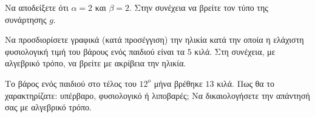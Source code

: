 \begin{alist}
\item Να αποδείξετε ότι $\alpha = 2$ και $\beta = 2$. Στην συνέχεια να βρείτε τον τύπο της συνάρτησης $g$.
\item Να προσδιορίσετε γραφικά (κατά προσέγγιση) την ηλικία κατά την οποία η ελάχιστη φυσιολογική τιμή του βάρους ενός παιδιού είναι τα $5$ κιλά. Στη συνέχεια, με αλγεβρικό τρόπο, να βρείτε με ακρίβεια την ηλικία.
\item Το βάρος ενός παιδιού στο τέλος του $12^{o}$ μήνα βρέθηκε $13$ κιλά. Πως θα το χαρακτηρίζατε:
υπέρβαρο, φυσιολογικό ή λιποβαρές; Να δικαιολογήσετε την απάντησή σας με αλγεβρικό
τρόπο.
\end{alist}

